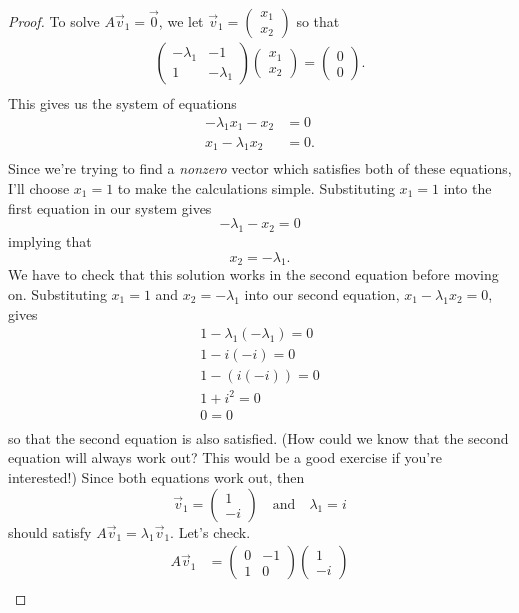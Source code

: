 \documentclass{article}
\begin{document}
\begin{proof}
To solve $A\vec{v}_1 = \vec{0}$, we let $\vec{v}_1 = \begin{pmatrix}x_1\\x_2\end{pmatrix}$ so that 
\begin{align*}
\begin{pmatrix}-\lambda_1&-1\\1&-\lambda_1\end{pmatrix}\begin{pmatrix}x_1\\x_2\end{pmatrix} = \begin{pmatrix}0\\0\end{pmatrix}.\\
\end{align*}
This gives us the system of equations
\begin{align*}
-\lambda_1 x_1 - x_2 &= 0\\
x_1 - \lambda_1 x_2 &= 0.\\
\end{align*}
Since we're trying to find a \textit{nonzero} vector which satisfies both of these equations, I'll choose $x_1 = 1$ to make the calculations simple. Substituting $x_1 = 1$ into the first equation in our system gives $$-\lambda_1 - x_2 = 0$$ implying that $$x_2 = -\lambda_1.$$ We have to check that this solution works in the second equation before moving on. Substituting $x_1 = 1$ and $x_2 = -\lambda_1$ into our second equation, $x_1 - \lambda_1 x_2 = 0$, gives 
\begin{align*}
1 - \lambda_1 \left(-\lambda_1\right) = 0\\
1 - i \left(-i\right) = 0\\
1 - \left( i\left(-i\right)\right) = 0\\
1 + i^2 = 0\\
0 = 0\\
\end{align*}
so that the second equation is also satisfied. (How could we know that the second equation will always work out? This would be a good exercise if you're interested!) Since both equations work out, then $$\vec{v}_1 = \begin{pmatrix}1\\-i\end{pmatrix} \quad \text{and} \quad \lambda_1 = i$$ should satisfy $A\vec{v}_1 = \lambda_1 \vec{v}_1$. Let's check.
\begin{align*}
A \vec{v}_1 &= \begin{pmatrix}0&-1\\1&0\end{pmatrix} \begin{pmatrix}1\\-i\end{pmatrix}\\

\end{align*}
\end{proof}
\end{document}
